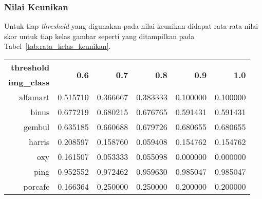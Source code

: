 \subsubsection{Nilai Keunikan}
Untuk tiap \textit{threshold} yang digunakan pada nilai keunikan didapat rata-rata nilai skor untuk tiap kelas gambar seperti yang ditampilkan pada Tabel~\ref{tab:rata_kelas_keunikan}.
\begin{table}[H]
	\centering
	\begin{tabular}{|r|r|r|r|r|r|}
		\hline
		\textbf{threshold}  & \multirow{2}{*}{\textbf{0.6}} & \multirow{2}{*}{\textbf{0.7}} & \multirow{2}{*}{\textbf{0.8}} & \multirow{2}{*}{\textbf{0.9}} & \multirow{2}{*}{\textbf{1.0}} \\ \cline{1-1}
		\textbf{img\_class} &                               &                               &                               &                               &                               \\ \hline
		alfamart            & 0.515710                      & 0.366667                      & 0.383333                      & 0.100000                      & 0.100000                      \\ \hline
		binus               & 0.677219                      & 0.680215                      & 0.676765                      & 0.591431                      & 0.591431                      \\ \hline
		gembul              & 0.635185                      & 0.660688                      & 0.679726                      & 0.680655                      & 0.680655                      \\ \hline
		harris              & 0.208597                      & 0.158760                      & 0.059408                      & 0.154762                      & 0.154762                      \\ \hline
		oxy                 & 0.161507                      & 0.053333                      & 0.055098                      & 0.000000                      & 0.000000                      \\ \hline
		ping                & 0.952552                      & 0.972462                      & 0.959630                      & 0.985047                      & 0.985047                      \\ \hline
		porcafe             & 0.166364                      & 0.250000                      & 0.250000                      & 0.200000                      & 0.200000                      \\ \hline

\end{tabular}
\end{table}
